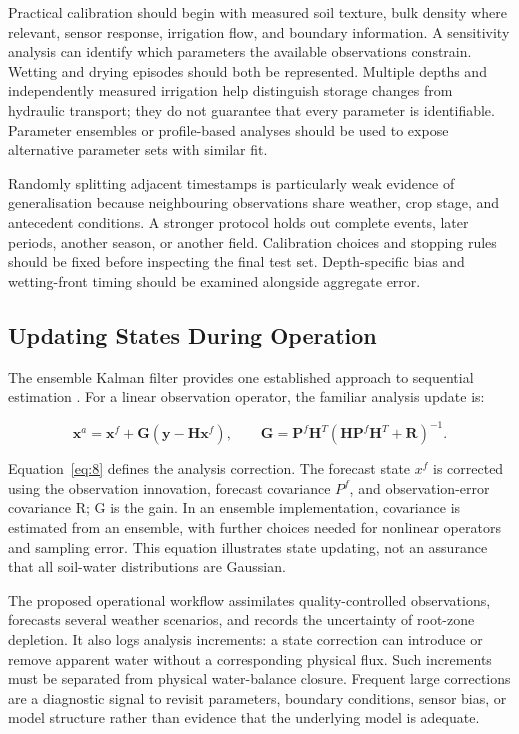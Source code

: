 \documentclass[acmsmall,screen,nonacm]{acmart}
\begin{document}
Practical calibration should begin with measured soil texture, bulk density where relevant, sensor response, irrigation flow, and boundary information. A sensitivity analysis can identify which parameters the available observations constrain. Wetting and drying episodes should both be represented. Multiple depths and independently measured irrigation help distinguish storage changes from hydraulic transport; they do not guarantee that every parameter is identifiable. Parameter ensembles or profile-based analyses should be used to expose alternative parameter sets with similar fit.

Randomly splitting adjacent timestamps is particularly weak evidence of generalisation because neighbouring observations share weather, crop stage, and antecedent conditions. A stronger protocol holds out complete events, later periods, another season, or another field. Calibration choices and stopping rules should be fixed before inspecting the final test set. Depth-specific bias and wetting-front timing should be examined alongside aggregate error.

\subsection{Updating States During Operation}

\label{sec:5-2}

The ensemble Kalman filter provides one established approach to sequential estimation \cite{R12}. For a linear observation operator, the familiar analysis update is:

\begin{equation}
\mathbf x^{a}=\mathbf x^{f}+\mathbf G(\mathbf y-\mathbf H\mathbf x^{f}),\qquad \mathbf G=\mathbf P^{f}\mathbf H^{T}\left(\mathbf H\mathbf P^{f}\mathbf H^{T}+\mathbf R\right)^{-1}.
\label{eq:8}
\end{equation}

Equation~\eqref{eq:8} defines the analysis correction. The forecast state $x^{f}$ is corrected using the observation innovation, forecast covariance $P^{f}$, and observation-error covariance R; G is the gain. In an ensemble implementation, covariance is estimated from an ensemble, with further choices needed for nonlinear operators and sampling error. This equation illustrates state updating, not an assurance that all soil-water distributions are Gaussian.

The proposed operational workflow assimilates quality-controlled observations, forecasts several weather scenarios, and records the uncertainty of root-zone depletion. It also logs analysis increments: a state correction can introduce or remove apparent water without a corresponding physical flux. Such increments must be separated from physical water-balance closure. Frequent large corrections are a diagnostic signal to revisit parameters, boundary conditions, sensor bias, or model structure rather than evidence that the underlying model is adequate.
\end{document}
